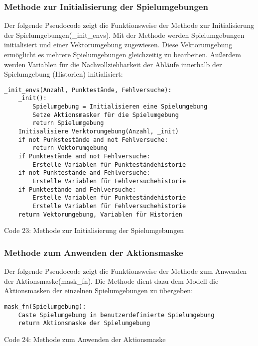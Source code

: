 \subsubsection{Methode zur Initialisierung der Spielumgebungen}
\begin{minipage}{\linewidth}
Der folgende Pseudocode zeigt die Funktionsweise der Methode zur Initialisierung der Spielumgebungen(\_init\_envs). Mit der Methode werden Spielumgebungen initialisiert und einer Vektorumgebung zugewiesen. Diese Vektorumgebung ermöglicht es mehrere Spielumgebungen gleichzeitig zu bearbeiten. Außerdem werden Variablen für die Nachvollziehbarkeit der Abläufe innerhalb der Spielumgebung (Historien) initialisiert:
\vspace{0.5cm}
\begin{lstlisting}
_init_envs(Anzahl, Punktestände, Fehlversuche):
	_init():
		Spielumgebung = Initialisieren eine Spielumgebung
		Setze Aktionsmasker für die Spielumgebung
		return Spielumgebung
	Initisalisiere Verktorumgebung(Anzahl, _init)
	if not Punkstestände and not Fehlversuche:
		return Vektorumgebung
	if Punktestände and not Fehlversuche:
		Erstelle Variablen für Punkteständehistorie
	if not Punktestände and Fehlversuche:
		Erstelle Variablen für Fehlversuchehistorie
	if Punktestände and Fehlversuche:
		Erstelle Variablen für Punkteständehistorie
		Erstelle Variablen für Fehlversuchehistorie
	return Vektorumgebung, Variablen für Historien
\end{lstlisting}
Code 23: Methode zur Initialisierung der Spielumgebungen\\
\end{minipage}

\subsubsection{Methode zum Anwenden der Aktionsmaske}
\begin{minipage}{\linewidth}
Der folgende Pseudocode zeigt die Funktionsweise der Methode zum Anwenden der Aktionsmaske(mask\_fn). Die Methode dient dazu dem Modell die Aktionsmasken der einzelnen Spielumgebungen zu übergeben:
\vspace{0.5cm}
\begin{lstlisting}
mask_fn(Spielumgebung):
	Caste Spielumgebung in benutzerdefinierte Spielumgebung
	return Aktionsmaske der Spielumgebung
\end{lstlisting}
Code 24: Methode zum Anwenden der Aktionsmaske\\
\end{minipage}

